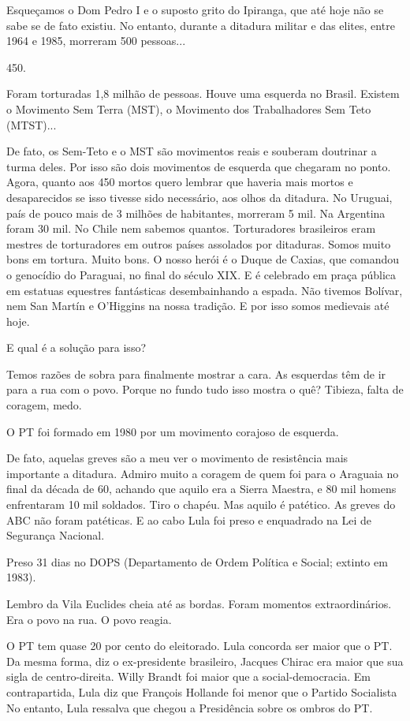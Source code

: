  Esqueçamos o Dom Pedro I e o suposto grito do Ipiranga, que até hoje
não se sabe se de fato existiu. No entanto, durante a ditadura militar e
das elites, entre 1964 e 1985, morreram 500 pessoas...

 450.

 Foram torturadas 1,8 milhão de pessoas. Houve uma esquerda no Brasil.
Existem o Movimento Sem Terra (MST), o Movimento dos Trabalhadores Sem
Teto (MTST)...

 De fato, os Sem-Teto e o MST são movimentos reais e souberam
doutrinar a turma deles. Por isso são dois movimentos de esquerda que
chegaram no ponto. Agora, quanto aos 450 mortos quero lembrar que
haveria mais mortos e desaparecidos se isso tivesse sido necessário, aos
olhos da ditadura. No Uruguai, país de pouco mais de 3 milhões de
habitantes, morreram 5 mil. Na Argentina foram 30 mil. No Chile nem
sabemos quantos. Torturadores brasileiros eram mestres de torturadores
em outros países assolados por ditaduras. Somos muito bons em tortura.
Muito bons. O nosso herói é o Duque de Caxias, que comandou o genocídio
do Paraguai, no final do século XIX. E é celebrado em praça pública em
estatuas equestres fantásticas desembainhando a espada. Não tivemos
Bolívar, nem San Martín e O'Higgins na nossa tradição. E por isso somos
medievais até hoje.

 E qual é a solução para isso?

 Temos razões de sobra para finalmente mostrar a cara. As esquerdas
têm de ir para a rua com o povo. Porque no fundo tudo isso mostra o quê?
Tibieza, falta de coragem, medo.

 O PT foi formado em 1980 por um movimento corajoso de esquerda.

 De fato, aquelas greves são a meu ver o movimento de resistência mais
importante a ditadura. Admiro muito a coragem de quem foi para o
Araguaia no final da década de 60, achando que aquilo era a Sierra
Maestra, e 80 mil homens enfrentaram 10 mil soldados. Tiro o chapéu. Mas
aquilo é patético. As greves do ABC não foram patéticas. E ao cabo Lula
foi preso e enquadrado na Lei de Segurança Nacional.

 Preso 31 dias no DOPS (Departamento de Ordem Política e Social;
extinto em 1983).

 Lembro da Vila Euclides cheia até as bordas. Foram momentos
extraordinários. Era o povo na rua. O povo reagia.

 O PT tem quase 20 por cento do eleitorado. Lula concorda ser maior
que o PT. Da mesma forma, diz o ex-presidente brasileiro, Jacques Chirac
era maior que sua sigla de centro-direita. Willy Brandt foi maior que a
social-democracia. Em contrapartida, Lula diz que François Hollande foi
menor que o Partido Socialista No entanto, Lula ressalva que chegou a
Presidência sobre os ombros do PT.

